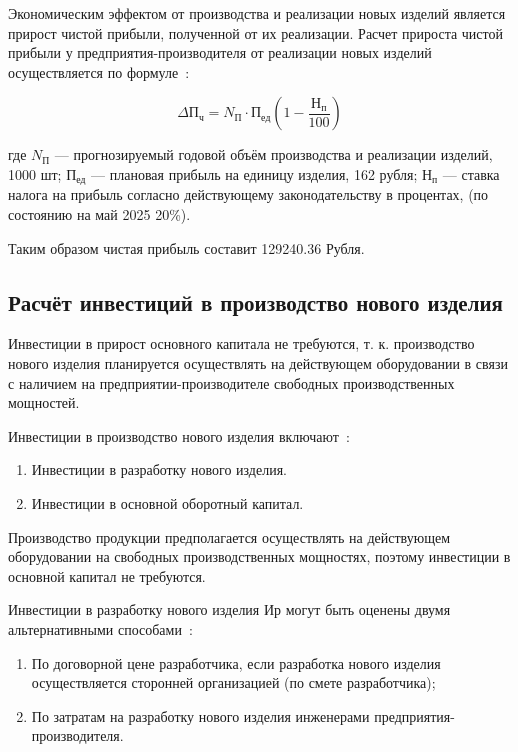 Экономическим эффектом от производства и реализации новых изделий
является прирост чистой прибыли, полученной от их реализации.  Расчет
прироста чистой прибыли у предприятия-производителя от реализации
новых изделий осуществляется по
формуле~\cite{bsuir-project-economics}:

\begin{equation}
  \Delta П_ч=N_П \cdot П_{ед} ( 1- \frac{Н_п}{100} )
\end{equation}

где $N_П$ — прогнозируемый годовой объём производства и реализации
изделий, 1000 шт; $П_{ед}$ — плановая прибыль на единицу изделия, 162 рубля;
$Н_п$ — ставка налога на прибыль согласно действующему законодательству в процентах,
(по состоянию на май 2025 20\%).

Таким образом чистая прибыль составит 129240.36 Рубля.


\subsection{Расчёт инвестиций в производство нового изделия}
Инвестиции в прирост основного капитала не требуются,
т. к. производство нового изделия планируется осуществлять на
действующем оборудовании в связи с наличием на
предприятии-производителе свободных производственных мощностей.

Инвестиции в производство нового изделия включают~\cite{bsuir-project-economics}:
\begin{enumerate}
\item Инвестиции в разработку нового изделия.
\item Инвестиции в основной оборотный капитал.
\end{enumerate}

Производство продукции предполагается осуществлять на действующем
оборудовании на свободных производственных мощностях, поэтому
инвестиции в основной капитал не требуются.


Инвестиции в разработку нового изделия $Ир$ могут быть оценены двумя
альтернативными способами~\cite{bsuir-project-economics}:
\begin{enumerate}
\item По договорной цене разработчика, если разработка нового изделия
  осуществляется сторонней организацией (по смете разработчика);
\item По затратам на разработку нового изделия инженерами
  предприятия-производителя.
\end{enumerate}

